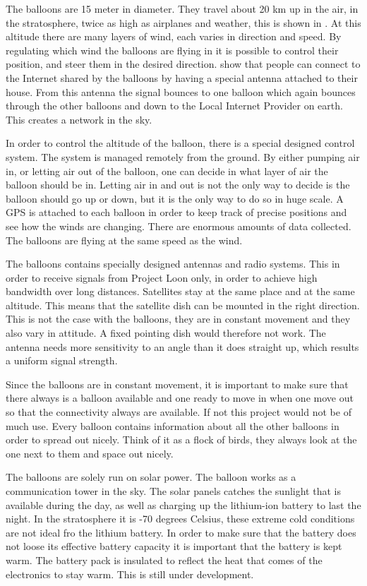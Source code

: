 The balloons are 15 meter in diameter. They travel about 20 km up in the air, in the stratosphere, twice as high as airplanes and weather, this is shown in . At this altitude there are many layers of wind, each varies in direction and speed. By regulating which wind the balloons are flying in it is possible to control their position, and steer them in the desired direction.  show that  people can connect to the Internet shared by the balloons by having a special antenna attached to their house. From this antenna the signal bounces to one balloon which again bounces through the other balloons and down to the Local Internet Provider on earth. This creates a network in the sky. 

In order to control the altitude of the balloon, there is a special designed control system. The system is managed remotely from the ground. By either pumping air in, or letting air out of the balloon, one can decide in what layer of air the balloon should be in. Letting air in and out is not the only way to decide is the balloon should go up or down, but it is the only way to do so in huge scale. A GPS is attached to each balloon in order to keep track of precise positions and see how the winds are changing. There are enormous amounts of data collected. The balloons are flying at the same speed as the wind.  

The balloons contains specially designed antennas and radio systems. This in order to receive signals from Project Loon only, in order to achieve high bandwidth over long distances. Satellites stay at the same place and at the same altitude. This means that the satellite dish can be mounted in the right direction. This is not the case with the balloons, they are in constant movement and they also vary in attitude. A fixed pointing dish would therefore not work. The antenna needs more sensitivity to an angle than it does straight up, which results a uniform signal strength. 

Since the balloons are in constant movement, it is important to make sure that there always is a balloon available and one ready to move in when one move out so that the connectivity always are available. If not this project would not be of much use. Every balloon contains information about all the other balloons in order to spread out nicely. Think of it as a flock of birds, they always look at the one next to them and space out nicely.

The balloons are solely run on solar power. The balloon works as a communication tower in the sky. The solar panels catches the sunlight that is available during the day, as well as charging up the lithium-ion battery to last the night. In the stratosphere it is -70 degrees Celsius, these extreme cold conditions are not ideal fro the lithium battery. In order to make sure that the battery does not loose its effective battery capacity it is important that the battery is kept warm. The battery pack is insulated to reflect the heat that comes of the electronics to stay warm. This is still under development. 

